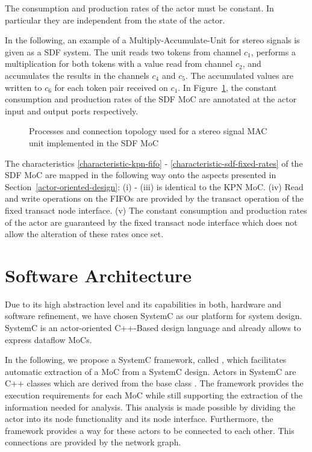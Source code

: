 \begin{characteristic}\label{characteristic-sdf-fixed-rates}
The consumption and production rates of the actor must be constant.
In particular they are independent from the state of the actor.
\end{characteristic}

In the following, an example of a Multiply-Accumulate-Unit for stereo signals is given
as a SDF system. The unit reads two tokens from channel $c_1$,
performs a multiplication for both tokens with a value read from channel $c_2$,
and accumulates the results in the channels $c_4$ and
$c_5$. The accumulated values are written to $c_6$ for each
token pair received on $c_1$.
In Figure~\ref{fig:sdf-mac-unit},
the constant consumption and production rates of the SDF
MoC are annotated at the actor input and output ports
respectively.

\begin{figure}[h]
\centering

\caption{Processes and connection topology used for a stereo signal MAC
  unit implemented in the SDF MoC}
\label{fig:sdf-mac-unit}
\end{figure}

The characteristics \ref{characteristic-kpn-fifo} -
\ref{characteristic-sdf-fixed-rates} of the SDF MoC are mapped in the following way
onto the aspects presented in Section~\ref{actor-oriented-design}: (i) - (iii) is identical
to the KPN MoC.
(iv) Read and write operations on the FIFOs are provided by the transact
operation of the fixed transact node interface.
(v) The constant consumption and production rates of the actor are
guaranteed by the fixed transact node interface which does
not allow the alteration of these rates once set.

\section{Software Architecture}\label{software-architecture}

Due to its high abstraction level and its capabilities in both,
hardware and software refinement, we have chosen SystemC
\cite{systemc-lrm:2003,glms:2002} as our platform for system design.
SystemC is an actor-oriented C++-Based design language and
already allows to express dataflow MoCs.

In the following, we propose a SystemC framework, called \SysteMoC, which
facilitates automatic extraction of a MoC from a SystemC design.
Actors in SystemC are C++ classes which are derived from the base class .
The \SysteMoC{} framework provides the execution requirements for each MoC while
still supporting the extraction of the information needed for analysis.
This analysis is made possible by dividing the actor into its
node functionality and its node interface.
Furthermore, the \SysteMoC{} framework provides a way for these
actors to be connected to each other. This connections
are provided by the network graph.

